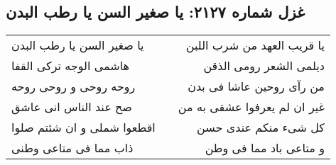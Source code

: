 \begin{center}
\section*{غزل شماره ۲۱۲۷: یا صغیر السن یا رطب البدن}
\label{sec:2127}
\begin{longtable}{l p{0.5cm} r}
یا صغیر السن یا رطب البدن
&&
یا قریب العهد من شرب اللبن
\\
هاشمی الوجه ترکی القفا
&&
دیلمی الشعر رومی الذقن
\\
روحه روحی و روحی روحه
&&
من رآی روحین عاشا فی بدن
\\
صح عند الناس انی عاشق
&&
غیر ان لم یعرفوا عشقی به من
\\
اقطعوا شملی و ان شئتم صلوا
&&
کل شیء منکم عندی حسن
\\
ذاب مما فی متاعی وطنی
&&
و متاعی باد مما فی وطن
\\
\end{longtable}
\end{center}
